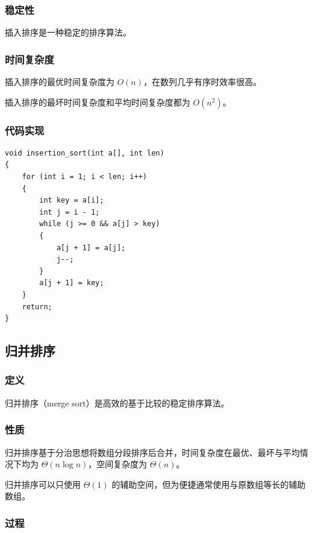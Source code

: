 \documentclass[12pt]{article}
\begin{document}
\subsubsection{稳定性}

插入排序是一种稳定的排序算法。

\subsubsection{时间复杂度}

插入排序的最优时间复杂度为 $O(n)$，在数列几乎有序时效率很高。

插入排序的最坏时间复杂度和平均时间复杂度都为 $O(n^2)$。

\subsubsection{代码实现}

{\setmainfont{Consolas} %
\begin{lstlisting}
void insertion_sort(int a[], int len)
{
    for (int i = 1; i < len; i++)
    {
        int key = a[i];
        int j = i - 1;
        while (j >= 0 && a[j] > key)
        {
            a[j + 1] = a[j];
            j--;
        }
        a[j + 1] = key;
    }
    return;
}
\end{lstlisting}
}

\subsection{归并排序}

\subsubsection{定义}

归并排序（merge sort）是高效的基于比较的稳定排序算法。

\subsubsection{性质}

归并排序基于分治思想将数组分段排序后合并，时间复杂度在最优、最坏与平均情况下均为 $\Theta (n \log n)$，空间复杂度为 $\Theta (n)$。

归并排序可以只使用 $\Theta (1)$ 的辅助空间，但为便捷通常使用与原数组等长的辅助数组。

\subsubsection{过程}
\end{document}
